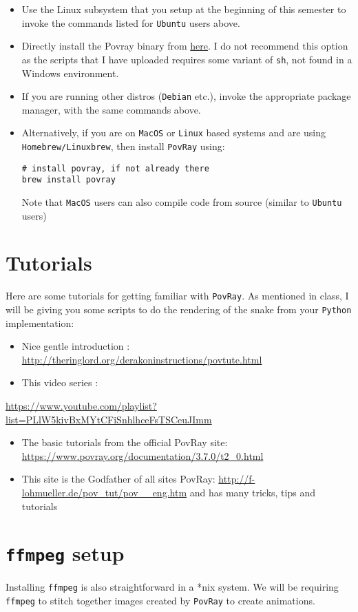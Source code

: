 \documentclass[11pt]{article}
\begin{document}
\begin{itemize}
\item Use the Linux subsystem that you setup at the beginning of this semester to
invoke the commands listed for \texttt{Ubuntu} users above.
\item Directly install the Povray binary from \href{http://www.povray.org/download/}{here}. I do not recommend this option
as the scripts that I have uploaded requires some variant of \texttt{sh}, not found
in a Windows environment.

\item If you are running other distros (\texttt{Debian} etc.), invoke the appropriate package
manager, with the same commands above.
\item Alternatively, if you are on \texttt{MacOS} or \texttt{Linux} based systems and are using
\texttt{Homebrew/Linuxbrew}, then install \texttt{PovRay} using:
\begin{verbatim}
# install povray, if not already there
brew install povray
\end{verbatim}
Note that \texttt{MacOS} users can also compile code from source (similar to \texttt{Ubuntu} users)
\end{itemize}

\section{Tutorials}
\label{sec:org0e98fd4}
Here are some tutorials for getting familiar with \texttt{PovRay}. As mentioned in
class, I will be giving you some scripts to do the rendering of the snake from
your \texttt{Python} implementation:
\begin{itemize}
\item Nice gentle introduction : \url{http://theringlord.org/derakoninstructions/povtute.html}
\item This video series :
\end{itemize}
\url{https://www.youtube.com/playlist?list=PLlW5kivBxMYtCFiSnhlhceFsTSCeuJImm}
\begin{itemize}
\item The basic tutorials from the official PovRay site: \url{https://www.povray.org/documentation/3.7.0/t2\_0.html}
\item This site is the Godfather of all sites PovRay:
\url{http://f-lohmueller.de/pov\_tut/pov\_\_eng.htm} and has many tricks, tips and tutorials
\end{itemize}
\section{\texttt{ffmpeg} setup}
\label{sec:org2582b40}
Installing \texttt{ffmpeg} is also straightforward in a *nix system. We will be
requiring \texttt{ffmpeg} to stitch together images created by \texttt{PovRay} to create
animations.
\end{document}
